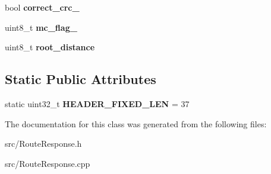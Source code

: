 \begin{DoxyCompactItemize}
\item 
\hypertarget{classRouteResponse_a85021e9523087b3ba0c6f9777393dd8b}{bool {\bfseries correct\-\_\-crc\-\_\-}}\label{classRouteResponse_a85021e9523087b3ba0c6f9777393dd8b}

\item 
\hypertarget{classRouteResponse_a4cdc1ebbb5a8e1e733a8b9434ce10be8}{uint8\-\_\-t {\bfseries mc\-\_\-flag\-\_\-}}\label{classRouteResponse_a4cdc1ebbb5a8e1e733a8b9434ce10be8}

\item 
\hypertarget{classRouteResponse_a4f2c9629843e8ec7cbdc5c4c8893add3}{uint8\-\_\-t {\bfseries root\-\_\-distance}}\label{classRouteResponse_a4f2c9629843e8ec7cbdc5c4c8893add3}

\end{DoxyCompactItemize}
\subsection*{Static Public Attributes}
\begin{DoxyCompactItemize}
\item 
\hypertarget{classRouteResponse_aa16bbeb6d1013a671756a131c9d8dd7a}{static uint32\-\_\-t {\bfseries H\-E\-A\-D\-E\-R\-\_\-\-F\-I\-X\-E\-D\-\_\-\-L\-E\-N} = 37}\label{classRouteResponse_aa16bbeb6d1013a671756a131c9d8dd7a}

\end{DoxyCompactItemize}


The documentation for this class was generated from the following files\-:\begin{DoxyCompactItemize}
\item 
src/Route\-Response.\-h\item 
src/Route\-Response.\-cpp\end{DoxyCompactItemize}
